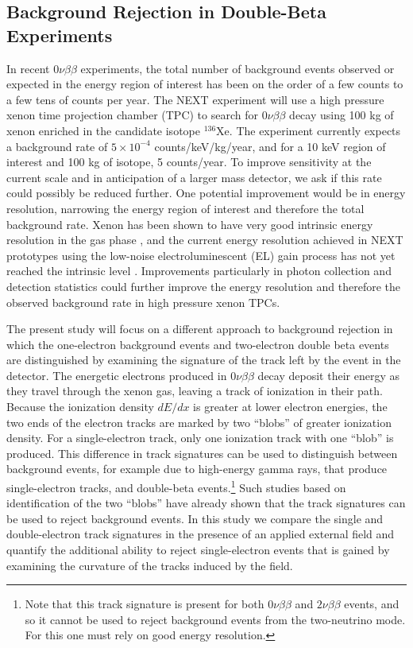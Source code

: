 \documentclass{JINST}
\begin{document}
\subsection{Background Rejection in Double-Beta Experiments}
In recent $0\nu\beta\beta$ experiments, the total number of background events observed or expected in the energy 
region of interest has been on the order of a few counts to a few tens of counts per year.  The NEXT experiment will use a 
high pressure xenon time projection chamber (TPC) to search for $0\nu\beta\beta$ decay
using 100 kg of xenon enriched in the candidate isotope $^{136}$Xe.  The experiment currently 
expects a background rate of $5 \times 10^{-4}$ counts/keV/kg/year, and for a 10 keV region of interest and 100 kg of 
isotope, 5 counts/year.  To improve sensitivity at the current scale and in anticipation of a larger mass detector, we ask
if this rate could possibly be reduced further.  One potential improvement would be in energy resolution, narrowing the
energy region of interest and therefore the total background rate.  Xenon has been shown to have very good intrinsic 
energy resolution in the gas phase \cite{Bolotnikov}, and the current energy resolution achieved in NEXT prototypes 
using the low-noise electroluminescent (EL) gain process has not yet reached the intrinsic level \cite{NEXT_2013}.  
Improvements particularly in photon collection and detection statistics could further improve the energy resolution and 
therefore the observed background rate in high pressure xenon TPCs.  

The present study will focus on a different approach to background rejection in which the one-electron background 
events and two-electron double beta events are distinguished by examining the signature of the track left by the event in 
the detector.  The energetic electrons produced in $0\nu\beta\beta$ decay deposit their energy as they travel through 
the xenon gas, leaving a track of ionization in their path.  Because the ionization density $dE/dx$ is greater at lower 
electron energies, the two ends of the electron tracks are marked by two ``blobs'' of greater ionization density.  For a 
single-electron track, only one ionization track with one ``blob'' is produced.  This difference in track signatures can be 
used to distinguish between background events, for example due to high-energy gamma rays, that produce 
single-electron tracks, and double-beta events.\footnote{Note that this track signature is present for both 
$0\nu\beta\beta$ and $2\nu\beta\beta$ events, and so it cannot be used to reject background events from the 
two-neutrino mode.  For this one must rely on good energy resolution.}  Such studies based on identification of the two 
``blobs'' have already shown that the track signatures can be used to reject background events.  In this study we 
compare the single and double-electron track signatures in the presence of an applied external field and quantify the 
additional ability to reject single-electron events that is gained by examining the curvature of the tracks induced by the 
field.
\end{document}
